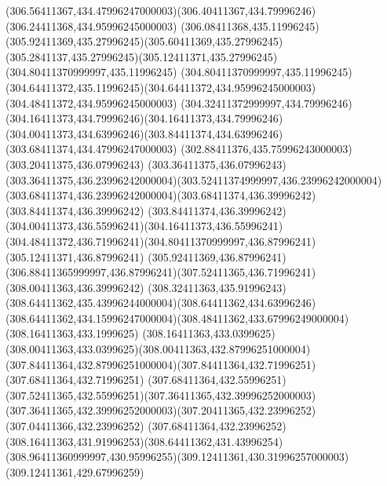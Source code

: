 {{	\curveto(306.56411367,434.47996247000003)(306.40411367,434.79996246)(306.24411368,434.95996245000003)
	\curveto(306.08411368,435.11996245)(305.92411369,435.27996245)(305.60411369,435.27996245)
	\curveto(305.2841137,435.27996245)(305.12411371,435.27996245)(304.80411370999997,435.11996245)
	\curveto(304.80411370999997,435.11996245)(304.64411372,435.11996245)(304.64411372,434.95996245000003)
	\lineto(304.48411372,434.95996245000003)
	\curveto(304.32411372999997,434.79996246)(304.16411373,434.79996246)(304.16411373,434.79996246)
	\curveto(304.00411373,434.63996246)(303.84411374,434.63996246)(303.68411374,434.47996247000003)
	\lineto(302.88411376,435.75996243000003)
	\lineto(303.20411375,436.07996243)
	\curveto(303.36411375,436.07996243)(303.36411375,436.23996242000004)(303.52411374999997,436.23996242000004)
	\curveto(303.68411374,436.23996242000004)(303.68411374,436.39996242)(303.84411374,436.39996242)
	\curveto(303.84411374,436.39996242)(304.00411373,436.55996241)(304.16411373,436.55996241)
	\curveto(304.48411372,436.71996241)(304.80411370999997,436.87996241)(305.12411371,436.87996241)
	\lineto(305.92411369,436.87996241)
	\curveto(306.88411365999997,436.87996241)(307.52411365,436.71996241)(308.00411363,436.39996242)
	\curveto(308.32411363,435.91996243)(308.64411362,435.43996244000004)(308.64411362,434.63996246)
	\curveto(308.64411362,434.15996247000004)(308.48411362,433.67996249000004)(308.16411363,433.1999625)
	\curveto(308.16411363,433.0399625)(308.00411363,433.0399625)(308.00411363,432.87996251000004)
	\curveto(307.84411364,432.87996251000004)(307.84411364,432.71996251)(307.68411364,432.71996251)
	\curveto(307.68411364,432.55996251)(307.52411365,432.55996251)(307.36411365,432.39996252000003)
	\curveto(307.36411365,432.39996252000003)(307.20411365,432.23996252)(307.04411366,432.23996252)
	\curveto(307.68411364,432.23996252)(308.16411363,431.91996253)(308.64411362,431.43996254)
	\curveto(308.96411360999997,430.95996255)(309.12411361,430.31996257000003)(309.12411361,429.67996259)
	\closepath
}
}
